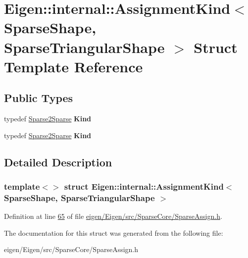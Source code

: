 \hypertarget{struct_eigen_1_1internal_1_1_assignment_kind_3_01_sparse_shape_00_01_sparse_triangular_shape_01_4}{}\section{Eigen\+:\+:internal\+:\+:Assignment\+Kind$<$ Sparse\+Shape, Sparse\+Triangular\+Shape $>$ Struct Template Reference}
\label{struct_eigen_1_1internal_1_1_assignment_kind_3_01_sparse_shape_00_01_sparse_triangular_shape_01_4}
\subsection*{Public Types}
\begin{DoxyCompactItemize}
\item 
\mbox{\label{struct_eigen_1_1internal_1_1_assignment_kind_3_01_sparse_shape_00_01_sparse_triangular_shape_01_4_a4e19ea09f4779069bfbe6460d19f1f47}} 
typedef \hyperlink{struct_eigen_1_1internal_1_1_sparse2_sparse}{Sparse2\+Sparse} {\bfseries Kind}
\item 
\mbox{\label{struct_eigen_1_1internal_1_1_assignment_kind_3_01_sparse_shape_00_01_sparse_triangular_shape_01_4_a4e19ea09f4779069bfbe6460d19f1f47}} 
typedef \hyperlink{struct_eigen_1_1internal_1_1_sparse2_sparse}{Sparse2\+Sparse} {\bfseries Kind}
\end{DoxyCompactItemize}


\subsection{Detailed Description}
\subsubsection*{template$<$$>$\newline
struct Eigen\+::internal\+::\+Assignment\+Kind$<$ Sparse\+Shape, Sparse\+Triangular\+Shape $>$}



Definition at line \hyperlink{eigen_2_eigen_2src_2_sparse_core_2_sparse_assign_8h_source_l00065}{65} of file \hyperlink{eigen_2_eigen_2src_2_sparse_core_2_sparse_assign_8h_source}{eigen/\+Eigen/src/\+Sparse\+Core/\+Sparse\+Assign.\+h}.



The documentation for this struct was generated from the following file\+:\begin{DoxyCompactItemize}
\item 
eigen/\+Eigen/src/\+Sparse\+Core/\+Sparse\+Assign.\+h\end{DoxyCompactItemize}
